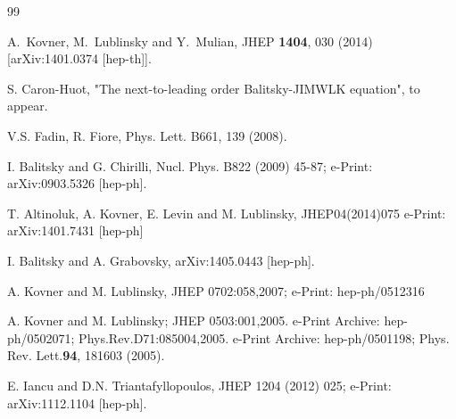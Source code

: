 \documentclass[11pt,a4paper]{article}
\begin{document}
\begin{thebibliography}{99}
  


  A.~Kovner, M.~Lublinsky and Y.~Mulian,
  JHEP {\bf 1404}, 030 (2014)
  [arXiv:1401.0374 [hep-th]].


 S. Caron-Huot, "The next-to-leading order Balitsky-JIMWLK equation", to appear.
  
 
  

 
  V.S. Fadin, R. Fiore, Phys. Lett. B661, 139 (2008).


 I. Balitsky and G. Chirilli, Nucl. Phys. B822 (2009) 45-87; e-Print: arXiv:0903.5326 [hep-ph].

 T. Altinoluk, A. Kovner, E. Levin and M. Lublinsky, JHEP04(2014)075
e-Print: arXiv:1401.7431 [hep-ph]


 I. Balitsky and A. Grabovsky, %
  arXiv:1405.0443 [hep-ph].


 A. Kovner and M. Lublinsky, JHEP 0702:058,2007;
e-Print: hep-ph/0512316


  A. Kovner and M. Lublinsky; JHEP 0503:001,2005.
e-Print Archive: hep-ph/0502071; Phys.Rev.D71:085004,2005.
e-Print Archive: hep-ph/0501198; Phys. Rev. Lett.{\bf 94}, 181603 (2005).

 E. Iancu and  D.N. Triantafyllopoulos, JHEP 1204 (2012) 025; e-Print: arXiv:1112.1104 [hep-ph].



\end{thebibliography}
\end{document}
